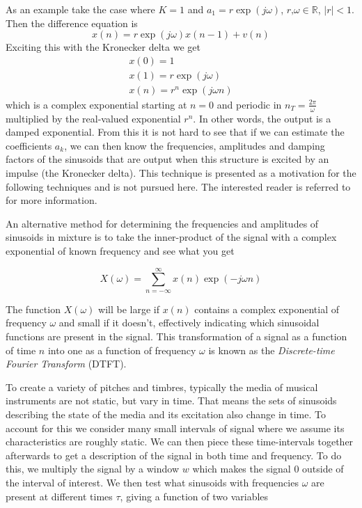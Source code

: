 As an example take the case where $K=1$ and $a_1 = r \exp(j\omega)$, 
$r\text{,}\omega \in \mathbb{R}$, $|r|<1$. Then the difference equation is
\begin{equation}
    x(n) = r \exp(j\omega) x(n-1) + v(n)
\end{equation}
Exciting this with the Kronecker delta we get
\begin{equation}
    \begin{array}{c}
        x(0) = 1 \\
        x(1) = r \exp(j\omega) \\
        x(n) = r^n \exp(j\omega n)
    \end{array}
\end{equation}
which is a complex exponential starting at $n=0$ and periodic in
$n_T=\frac{2\pi}{\omega}$ multiplied by the real-valued
exponential $r^n$. In other words, the output is a damped exponential. From this
it is not hard to see that if we can estimate the coefficients $a_k$, we can
then know the frequencies, amplitudes and damping factors of the sinusoids that
are output when this structure is excited by an impulse (the Kronecker delta).
This technique is presented as a motivation for the following techniques and is
not pursued here. The interested reader is referred to \cite{makhoul1975linear}
for more information.

An alternative method for determining the frequencies and amplitudes of
sinusoids in mixture is to take the inner-product of the signal with a complex
exponential of known frequency and see what you get

\begin{equation}
    X(\omega) = \sum_{n=-\infty}^{\infty} x(n) \exp(-j \omega n)
\end{equation}

The function $X(\omega)$ will be large if $x(n)$ contains a complex exponential of
frequency $\omega$ and small if it doesn't, effectively indicating which
sinusoidal functions are present in the signal. This transformation of a signal
as a function of time $n$ into one as a function of frequency $\omega$ is known
as the \textit{Discrete-time Fourier Transform} (DTFT). 

To create a variety of pitches and timbres, typically the media of musical
instruments are not static, but vary in time. That means the sets of sinusoids
describing the state of the media and its excitation also change in time. To
account for this we consider many small intervals of signal where we assume its
characteristics are roughly static. We can then piece these time-intervals
together afterwards to get a description of the signal in both time and
frequency. To do this, we multiply the signal by a window $w$ which makes the signal
0 outside of the interval of interest. We then test what sinusoids with
frequencies $\omega$ are present at different times $\tau$, giving a function of
two variables


